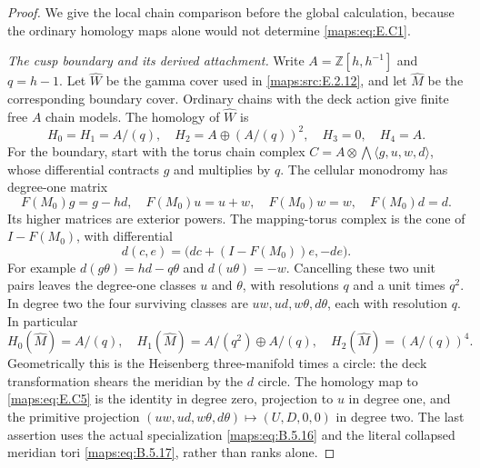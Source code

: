 \begin{proof}
We give the local chain comparison before the global
calculation, because the ordinary homology maps alone would
not determine \eqref{maps:eq:E.C1}.

\emph{The cusp boundary and its derived attachment.}
Write $A=\mathbb Z[h,h^{-1}]$ and $q=h-1$. Let
$\widehat W$ be the gamma cover used in \ref{maps:src:E.2.12}, and let
$\widehat M$ be the corresponding boundary cover. Ordinary
chains with the deck action give finite free $A$ chain
models. The homology of $\widehat W$ is
\[
 H_0=H_1=A/(q),\quad H_2=A\oplus(A/(q))^2,
 \quad H_3=0,\quad H_4=A.
 \tag{E.C5}\label{maps:eq:E.C5}
\]
For the boundary, start with the torus chain complex
$C= A\otimes\bigwedge\langle g,u,w,d\rangle$,
whose differential contracts $g$ and multiplies by $q$.
The cellular monodromy has degree-one matrix
\[
 F(M_0)g=g-hd,\quad F(M_0)u=u+w,
 \quad F(M_0)w=w,\quad F(M_0)d=d.
 \tag{E.C6}\label{maps:eq:E.C6}
\]
Its higher matrices are exterior powers. The mapping-torus
complex is the cone of $I-F(M_0)$, with differential
\[
 d(c,e)=\big(dc+(I-F(M_0))e,-de\big).
 \tag{E.C7}\label{maps:eq:E.C7}
\]
For example $d(g\theta)=hd-q\theta$ and
$d(u\theta)=-w$. Cancelling these two unit pairs leaves
the degree-one classes $u$ and $\theta$, with resolutions
$q$ and a unit times $q^2$. In degree two the four surviving
classes are $uw,ud,w\theta,d\theta$, each with resolution
$q$. In particular
\[
 H_0(\widehat M)=A/(q),\quad
 H_1(\widehat M)=A/(q^2)\oplus A/(q),\quad
 H_2(\widehat M)=(A/(q))^4.
 \tag{E.C8}\label{maps:eq:E.C8}
\]
Geometrically this is the Heisenberg three-manifold times
a circle: the deck transformation shears the meridian
by the $d$ circle. The homology map to \eqref{maps:eq:E.C5} is the
identity in degree zero, projection to $u$ in degree one,
and the primitive projection
$(uw,ud,w\theta,d\theta)\mapsto(U,D,0,0)$ in degree two.
The last assertion uses the actual specialization
\eqref{maps:eq:B.5.16} and the literal collapsed meridian tori
\eqref{maps:eq:B.5.17}, rather than ranks alone.


\end{proof}
